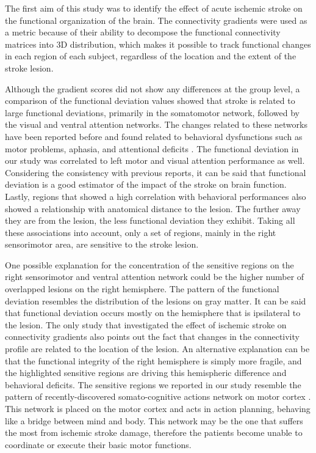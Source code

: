 \documentclass[fleqn,10pt]{wlscirep}
\begin{document}
The first aim of this study was to identify the effect of acute ischemic stroke on the functional organization of the brain. The connectivity gradients were used as a metric because of their ability to decompose the functional connectivity matrices into 3D distribution, which makes it possible to track functional changes in each region of each subject, regardless of the location and the extent of the stroke lesion. 


Although the gradient scores did not show any differences at the group level, a comparison of the functional deviation values showed that stroke is related to large functional deviations, primarily in the somatomotor network, followed by the visual and ventral attention networks. The changes related to these networks have been reported before and found related to behavioral dysfunctions such as motor problems, aphasia, and attentional deficits \citep{carter2010resting, corbetta2002control, siegel2016disruptions, he2007breakdown}. The functional deviation in our study was correlated to left motor and visual attention performance as well. Considering the consistency with previous reports, it can be said that functional deviation is a good estimator of the impact of the stroke on brain function. Lastly, regions that showed a high correlation with behavioral performances also showed a relationship with anatomical distance to the lesion. The further away they are from the lesion, the less functional deviation they exhibit. Taking all these associations into account, only a set of regions, mainly in the right sensorimotor area, are sensitive to the stroke lesion.

One possible explanation for the concentration of the sensitive regions on the right sensorimotor and ventral attention network could be the higher number of overlapped lesions on the right hemisphere. The pattern of the functional deviation resembles the distribution of the lesions on gray matter. It can be said that functional deviation occurs mostly on the hemisphere that is ipsilateral to the lesion. The only study that investigated the effect of ischemic stroke on connectivity gradients \citep{bayrak2019impact} also points out the fact that changes in the connectivity profile are related to the location of the lesion. An alternative explanation can be that the functional integrity of the right hemisphere is simply more fragile, and the highlighted sensitive regions are driving this hemispheric difference and behavioral deficits. The sensitive regions we reported in our study resemble the pattern of recently-discovered somato-cognitive actions network on motor cortex \citep{gordon2023somato}. This network is placed on the motor cortex and acts in action planning, behaving like a bridge between mind and body. This network may be the one that suffers the most from ischemic stroke damage, therefore the patients become unable to coordinate or execute their basic motor functions. 
\end{document}
